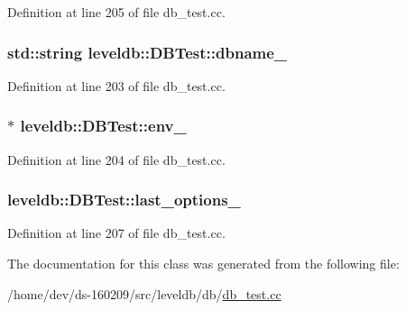 Definition at line 205 of file db\+\_\+test.\+cc.

\hypertarget{classleveldb_1_1_d_b_test_ab7eb9815f522ad154816d72d1cc23a86}{}
\subsubsection[{dbname\+\_\+}]{\setlength{\rightskip}{0pt plus 5cm}std\+::string leveldb\+::\+D\+B\+Test\+::dbname\+\_\+}\label{classleveldb_1_1_d_b_test_ab7eb9815f522ad154816d72d1cc23a86}


Definition at line 203 of file db\+\_\+test.\+cc.

\hypertarget{classleveldb_1_1_d_b_test_ae6bb66675fe5419ed647efd1bfd332f8}{}
\subsubsection[{env\+\_\+}]{$\ast$ leveldb\+::\+D\+B\+Test\+::env\+\_\+}\label{classleveldb_1_1_d_b_test_ae6bb66675fe5419ed647efd1bfd332f8}


Definition at line 204 of file db\+\_\+test.\+cc.

\hypertarget{classleveldb_1_1_d_b_test_adc05df912917d8de411d0672af04330f}{}
\subsubsection[{last\+\_\+options\+\_\+}]{ leveldb\+::\+D\+B\+Test\+::last\+\_\+options\+\_\+}\label{classleveldb_1_1_d_b_test_adc05df912917d8de411d0672af04330f}


Definition at line 207 of file db\+\_\+test.\+cc.



The documentation for this class was generated from the following file\+:\begin{DoxyCompactItemize}
\item 
/home/dev/ds-\/160209/src/leveldb/db/\hyperlink{db__test_8cc}{db\+\_\+test.\+cc}\end{DoxyCompactItemize}
